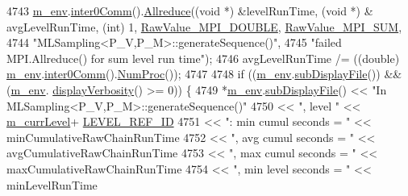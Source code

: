 \begin{DoxyCode}
{{{{4743       \hyperlink{class_q_u_e_s_o_1_1_m_l_sampling_a13f1ca4fe9f94822fe572a743eaced1d}{m\_env}.\hyperlink{class_q_u_e_s_o_1_1_base_environment_a689e4d140c74d495d97eb498714a4b82}{inter0Comm}().\hyperlink{class_q_u_e_s_o_1_1_mpi_comm_a72e137e60ef8060efb1ee5fc874fa4b8}{Allreduce}((\textcolor{keywordtype}{void} *) &levelRunTime, (\textcolor{keywordtype}{void} *) &
      avgLevelRunTime, (\textcolor{keywordtype}{int}) 1, \hyperlink{_mpi_comm_8h_ad0f503bd9fecfe4e570ca3d15aaf2518}{RawValue\_MPI\_DOUBLE}, \hyperlink{_mpi_comm_8h_afbf78d291c032aa7f512bc566cee2bd1}{RawValue\_MPI\_SUM},
4744                                    \textcolor{stringliteral}{"MLSampling<P\_V,P\_M>::generateSequence()"},
4745                                    \textcolor{stringliteral}{"failed MPI.Allreduce() for sum level run time"});
4746       avgLevelRunTime /= ((double) \hyperlink{class_q_u_e_s_o_1_1_m_l_sampling_a13f1ca4fe9f94822fe572a743eaced1d}{m\_env}.\hyperlink{class_q_u_e_s_o_1_1_base_environment_a689e4d140c74d495d97eb498714a4b82}{inter0Comm}().\hyperlink{class_q_u_e_s_o_1_1_mpi_comm_aa780721ae0fdeabc5a15e04cb0cad964}{NumProc}());
4747 
4748       \textcolor{keywordflow}{if} ((\hyperlink{class_q_u_e_s_o_1_1_m_l_sampling_a13f1ca4fe9f94822fe572a743eaced1d}{m\_env}.\hyperlink{class_q_u_e_s_o_1_1_base_environment_a8a0064746ae8dddfece4229b9ad374d6}{subDisplayFile}()) && (\hyperlink{class_q_u_e_s_o_1_1_m_l_sampling_a13f1ca4fe9f94822fe572a743eaced1d}{m\_env}.
      \hyperlink{class_q_u_e_s_o_1_1_base_environment_a1fe5f244fc0316a0ab3e37463f108b96}{displayVerbosity}() >= 0)) \{
4749         *\hyperlink{class_q_u_e_s_o_1_1_m_l_sampling_a13f1ca4fe9f94822fe572a743eaced1d}{m\_env}.\hyperlink{class_q_u_e_s_o_1_1_base_environment_a8a0064746ae8dddfece4229b9ad374d6}{subDisplayFile}() << \textcolor{stringliteral}{"In MLSampling<P\_V,P\_M>::generateSequence()"}
4750                                 << \textcolor{stringliteral}{", level "}               << \hyperlink{class_q_u_e_s_o_1_1_m_l_sampling_af9416874c856e50f3b35270e801f17e4}{m\_currLevel}+
      \hyperlink{_m_l_sampling_level_options_8h_a68d15eaf394d210effcf584b938206d3}{LEVEL\_REF\_ID}
4751                                 << \textcolor{stringliteral}{": min cumul seconds = "} << minCumulativeRawChainRunTime
4752                                 << \textcolor{stringliteral}{", avg cumul seconds = "} << avgCumulativeRawChainRunTime
4753                                 << \textcolor{stringliteral}{", max cumul seconds = "} << maxCumulativeRawChainRunTime
4754                                 << \textcolor{stringliteral}{", min level seconds = "} << minLevelRunTime
}}}}
\end{DoxyCode}
